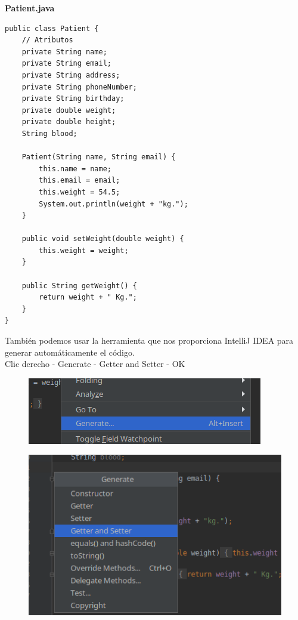 \documentclass{article}
\begin{document}
\textbf{Patient.java}
\begin{verbatim}
public class Patient {
    // Atributos
    private String name;
    private String email;
    private String address;
    private String phoneNumber;
    private String birthday;
    private double weight;
    private double height;
    String blood;

    Patient(String name, String email) {
        this.name = name;
        this.email = email;
        this.weight = 54.5;
        System.out.println(weight + "kg.");
    }

    public void setWeight(double weight) {
        this.weight = weight;
    }

    public String getWeight() {
        return weight + " Kg.";
    }
}
\end{verbatim}

También podemos usar la herramienta que nos proporciona IntelliJ IDEA para
generar automáticamente el código.\\

\newpage
Clic derecho - Generate - Getter and Setter - OK\\

\begin{figure}[h!]
  \centering
  \includegraphics[scale=0.75]{./Pictures/033_generate.png}
\end{figure}

\begin{figure}[h!]
  \centering
  \includegraphics[scale=0.75]{./Pictures/034_generate.png}
\end{figure}
\end{document}
